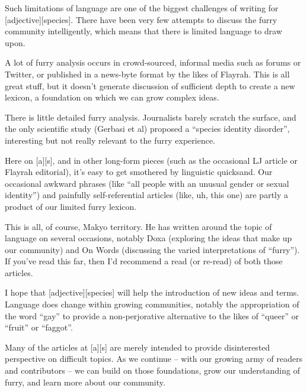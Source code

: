 Such limitations of language are one of the biggest challenges of writing for [adjective][species]. There have been very few attempts to discuss the furry community intelligently, which means that there is limited language to draw upon.

A lot of furry analysis occurs in crowd-sourced, informal media such as forums or Twitter, or published in a news-byte format by the likes of Flayrah. This is all great stuff, but it doesn't generate discussion of sufficient depth to create a new lexicon, a foundation on which we can grow complex ideas.

There is little detailed furry analysis. Journalists barely scratch the surface, and the only scientific study (Gerbasi et al) proposed a ``species identity disorder'', interesting but not really relevant to the furry experience.

Here on [a][s], and in other long-form pieces (such as the occasional LJ article or Flayrah editorial), it's easy to get smothered by linguistic quicksand. Our occasional awkward phrases (like ``all people with an unusual gender or sexual identity'') and painfully self-referential articles (like, uh, this one) are partly a product of our limited furry lexicon.

This is all, of course, Makyo territory. He has written around the topic of language on several occasions, notably Doxa (exploring the ideas that make up our community) and On Words (discussing the varied interpretations of ``furry''). If you've read this far, then I'd recommend a read (or re-read) of both those articles.

I hope that [adjective][species] will help the introduction of new ideas and terms. Language does change within growing communities, notably the appropriation of the word ``gay'' to provide a non-perjorative alternative to the likes of ``queer'' or ``fruit'' or ``faggot''.

Many of the articles at [a][s] are merely intended to provide disinterested perspective on difficult topics. As we continue -- with our growing army of readers and contributors -- we can build on those foundations, grow our understanding of furry, and learn more about our community.
